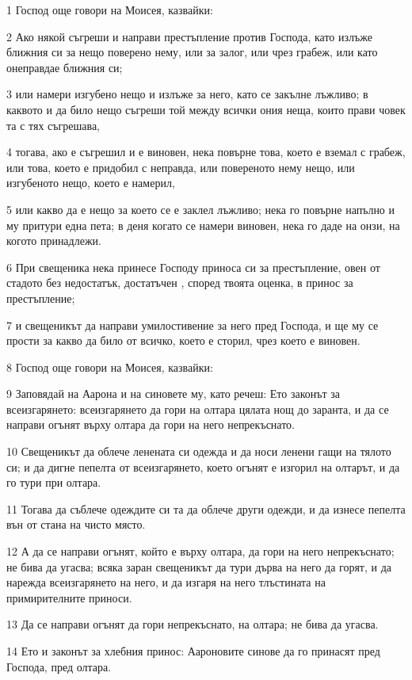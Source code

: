 \par 1 Господ още говори на Моисея, казвайки:
\par 2 Ако някой съгреши и направи престъпление против Господа, като излъже ближния си за нещо поверено нему, или за залог, или чрез грабеж, или като онеправдае ближния си;
\par 3 или намери изгубено нещо и излъже за него, като се закълне лъжливо; в каквото и да било нещо съгреши той между всички ония неща, които прави човек та с тях съгрешава,
\par 4 тогава, ако е съгрешил и е виновен, нека повърне това, което е вземал с грабеж, или това, което е придобил с неправда, или повереното нему нещо, или изгубеното нещо, което е намерил,
\par 5 или какво да е нещо за което се е заклел лъжливо; нека го повърне напълно и му притури една пета; в деня когато се намери виновен, нека го даде на онзи, на когото принадлежи.
\par 6 При свещеника нека принесе Господу приноса си за престъпление, овен от стадото без недостатък, достатъчен , според твоята оценка, в принос за престъпление;
\par 7 и свещеникът да направи умилостивение за него пред Господа, и ще му се прости за какво да било от всичко, което е сторил, чрез което е виновен.
\par 8 Господ още говори на Моисея, казвайки:
\par 9 Заповядай на Аарона и на синовете му, като речеш: Ето законът за всеизгарянето: всеизгарянето да гори на олтара цялата нощ до заранта, и да се направи огънят върху олтара да гори на него непрекъснато.
\par 10 Свещеникът да облече ленената си одежда и да носи ленени гащи на тялото си; и да дигне пепелта от всеизгарянето, което огънят е изгорил на олтарът, и да го тури при олтара.
\par 11 Тогава да съблече одеждите си та да облече други одежди, и да изнесе пепелта вън от стана на чисто място.
\par 12 А да се направи огънят, който е върху олтара, да гори на него непрекъснато; не бива да угасва; всяка заран свещеникът да тури дърва на него да горят, и да нарежда всеизгарянето на него, и да изгаря на него тлъстината на примирителните приноси.
\par 13 Да се направи огънят да гори непрекъснато, на олтара; не бива да угасва.
\par 14 Ето и законът за хлебния принос: Аароновите синове да го принасят пред Господа, пред олтара.
